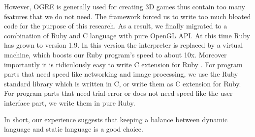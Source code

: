 However, OGRE is generally used for creating 3D games thus contain too many features that we do not need. The framework forced us to write too much bloated code for the purpose of this research. As a result, we finally migrated to a combination of Ruby and C language with pure OpenGL API. At this time Ruby has grown to version 1.9. In this version the interpreter is replaced by a virtual machine, which boosts our Ruby program's speed to about 10x. Moreover importantly it is ridiculously easy to write C extension for Ruby \citep{Reference15}. For program parts that need speed like networking and image processing, we use the Ruby standard library which is written in C, or write them as C extension for Ruby. For program parts that need trial-error or does not need speed like the user interface part, we write them in pure Ruby.

In short, our experience suggests that keeping a balance between dynamic language and static language is a good choice.
